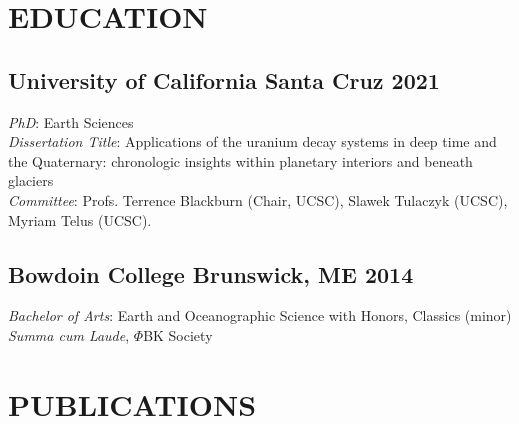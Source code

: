 \documentclass[10pt]{article}
\begin{document}

\section*{EDUCATION}

\subsection*{\textbf{University of California Santa Cruz} \hfill 2021}
\textit{PhD}: Earth Sciences\\
\textit{Dissertation Title}: Applications of the uranium decay systems in deep time and the Quaternary: chronologic insights within planetary interiors and beneath glaciers\\
\textit{Committee}: Profs. Terrence Blackburn (Chair, UCSC), Slawek Tulaczyk (UCSC), Myriam Telus (UCSC).

\subsection*{\textbf{Bowdoin College} \hspace{15pt} Brunswick, ME \hfill 2014}
\textit{Bachelor of Arts}: Earth and Oceanographic Science with Honors, Classics (minor) \\
\textit{Summa cum Laude}, $\Phi$BK Society


\section*{PUBLICATIONS}
\end{document}
